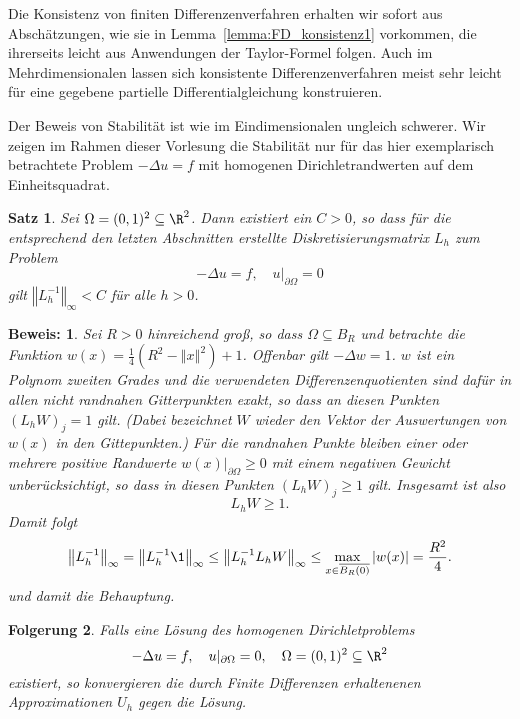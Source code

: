 \documentclass[
]{mycourse}
\theoremstyle{mythm}
\newtheorem{theorem}{Satz}[chapter]
\newtheorem{korollar}[theorem]{Folgerung}
\theoremstyle{break}
\newtheorem*{beweis}{Beweis:}
\newcommand{\norm}[1]{\left\Vert#1\right\Vert}		%
\begin{document}
Die Konsistenz von finiten Differenzenverfahren erhalten wir sofort aus Abschätzungen, wie sie in Lemma~\ref{lemma:FD_konsistenz1}
vorkommen, die ihrerseits leicht aus Anwendungen der Taylor-Formel folgen. Auch im Mehrdimensionalen lassen
sich konsistente Differenzenverfahren meist sehr leicht für eine gegebene partielle Differentialgleichung konstruieren. 

Der Beweis von Stabilität ist wie im Eindimensionalen ungleich schwerer. %
Wir zeigen im Rahmen dieser Vorlesung die Stabilität nur für das hier exemplarisch betrachtete 
Problem $-\Delta u=f$ mit homogenen Dirichletrandwerten auf dem Einheitsquadrat.

\begin{theorem}
Sei $\Omega=(0,1)^2\subseteq \R^2$. Dann existiert ein $C>0$, so dass für die entsprechend den
letzten Abschnitten erstellte Diskretisierungsmatrix $L_h$ zum Problem 
\[
-\Delta u=f, \quad u|_{\partial \Omega}=0
\]
gilt $\norm{L_h^{-1}}_\infty < C$ für alle $h>0$. 
\end{theorem}
\begin{beweis}
Sei $R>0$ hinreichend groß, so dass $\Omega\subseteq B_{R}$ und betrachte die Funktion $w(x)=\frac{1}{4}\left( R^2 -\norm{x}^2 \right)+1$. 
Offenbar gilt $-\Delta w=1$. $w$ ist ein Polynom zweiten Grades und die verwendeten Differenzenquotienten sind dafür 
in allen nicht randnahen Gitterpunkten exakt, so dass an diesen Punkten $(L_h W)_j=1$ gilt. (Dabei bezeichnet $W$ wieder den 
Vektor der Auswertungen von $w(x)$ in den Gittepunkten.) Für die randnahen Punkte bleiben einer oder
mehrere positive Randwerte $w(x)|_{\partial \Omega}\geq 0$ 
mit einem negativen Gewicht unberücksichtigt, so dass in diesen Punkten $(L_h W)_j\geq 1$ gilt.
Insgesamt ist also 
\[
L_h W\geq 1.
\]
Damit folgt
\[
\norm{L_h^{-1}}_\infty= \norm{L_h^{-1} \1}_\infty\leq \norm{L_h^{-1} L_h W}_\infty \leq \max_{x\in \overline{B_R(0)}} |w(x)|= \frac{R^2}{4}.
\]
und damit die Behauptung.
\end{beweis}

\begin{korollar}
Falls eine Lösung des homogenen Dirichletproblems
\[
-\Delta u=f, \quad u|_{\partial \Omega}=0, \quad \Omega=(0,1)^2\subseteq \R^2
\]
existiert, so konvergieren die durch Finite Differenzen erhaltenenen Approximationen $U_h$ gegen die Lösung. 
\end{korollar}
\end{document}

